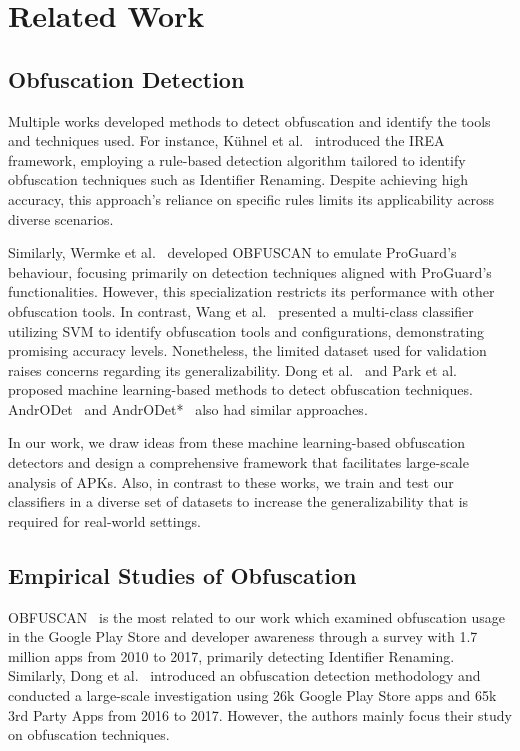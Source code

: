 \section{Related Work}
\label{Sec:Related Work}

\subsection{Obfuscation Detection}

Multiple works developed methods to detect obfuscation and identify the tools and techniques used. For instance, Kühnel et al.~\cite{kuhnel2015fast} introduced the IREA framework, employing a rule-based detection algorithm tailored to identify obfuscation techniques such as Identifier Renaming. Despite achieving high accuracy, this approach's reliance on specific rules limits its applicability across diverse scenarios. 

Similarly, Wermke et al.~\cite{wermke2018large} developed OBFUSCAN to emulate ProGuard's behaviour, focusing primarily on detection techniques aligned with ProGuard's functionalities. However, this specialization restricts its performance with other obfuscation tools. In contrast, Wang et al.~\cite{wang2017changed} presented a multi-class classifier utilizing SVM to identify obfuscation tools and configurations, demonstrating promising accuracy levels. Nonetheless, the limited dataset used for validation raises concerns regarding its generalizability. Dong et al.~\cite{dong2018understanding} and Park et al.~\cite{park2019framework} proposed machine learning-based methods to detect obfuscation techniques. AndrODet~\cite{mirzaei2019androdet} and AndrODet*~\cite{conti2022obfuscation} also had similar approaches.

In our work, we draw ideas from these machine learning-based obfuscation detectors and design a comprehensive framework that facilitates large-scale analysis of APKs. Also, in contrast to these works, we train and test our classifiers in a diverse set of datasets to increase the generalizability that is required for real-world settings.

\subsection{Empirical Studies of Obfuscation}
OBFUSCAN~\cite{wermke2018large} is the most related to our work which examined obfuscation usage in the Google Play Store and developer awareness through a survey with 1.7 million apps from 2010 to 2017, primarily detecting Identifier Renaming. 
Similarly, Dong et al.~\cite{dong2018understanding} introduced an obfuscation detection methodology and conducted a large-scale investigation using 26k Google Play Store apps and 65k 3rd Party Apps from 2016 to 2017. However, the authors mainly focus their study on obfuscation techniques.

